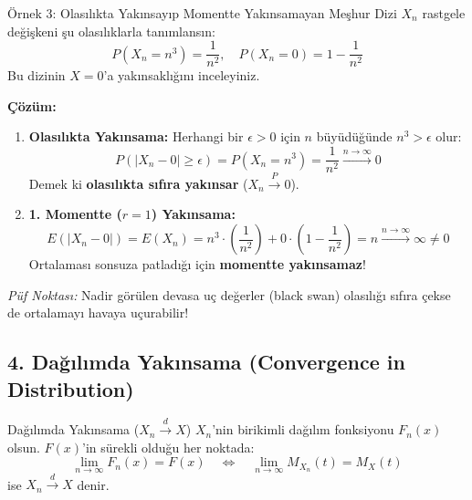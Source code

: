 \documentclass[12pt,a4paper]{article}
\begin{document}
\begin{ornek}{Örnek 3: Olasılıkta Yakınsayıp Momentte Yakınsamayan Meşhur Dizi}
$X_n$ rastgele değişkeni şu olasılıklarla tanımlansın:
\begin{equation}
    P(X_n = n^3) = \frac{1}{n^2}, \quad P(X_n = 0) = 1 - \frac{1}{n^2}
\end{equation}
Bu dizinin $X=0$'a yakınsaklığını inceleyiniz.

\bigskip
\textbf{Çözüm:}
\begin{enumerate}
    \item \textbf{Olasılıkta Yakınsama:}  
    Herhangi bir $\epsilon > 0$ için $n$ büyüdüğünde $n^3 > \epsilon$ olur:
    \begin{equation}
        P(|X_n - 0| \ge \epsilon) = P(X_n = n^3) = \frac{1}{n^2} \xrightarrow{n \to \infty} 0
    \end{equation}
    Demek ki \textbf{olasılıkta sıfıra yakınsar} ($X_n \xrightarrow{P} 0$).
    \item \textbf{1. Momentte ($r=1$) Yakınsama:}
    \begin{equation}
        E(|X_n - 0|) = E(X_n) = n^3 \cdot \left(\frac{1}{n^2}\right) + 0 \cdot \left(1 - \frac{1}{n^2}\right) = n \xrightarrow{n \to \infty} \infty \neq 0
    \end{equation}
    Ortalaması sonsuza patladığı için \textbf{momentte yakınsamaz}!
\end{enumerate}
\textit{Püf Noktası:} Nadir görülen devasa uç değerler (black swan) olasılığı sıfıra çekse de ortalamayı havaya uçurabilir!
\end{ornek}

\subsection{4. Dağılımda Yakınsama (Convergence in Distribution)}

\begin{tanim}{Dağılımda Yakınsama ($X_n \xrightarrow{d} X$)}
$X_n$'nin birikimli dağılım fonksiyonu $F_n(x)$ olsun. $F(x)$'in sürekli olduğu her noktada:
\begin{equation}
    \lim_{n \to \infty} F_n(x) = F(x) \quad \iff \quad \lim_{n \to \infty} M_{X_n}(t) = M_X(t)
\end{equation}
ise $X_n \xrightarrow{d} X$ denir.
\end{tanim}
\end{document}
